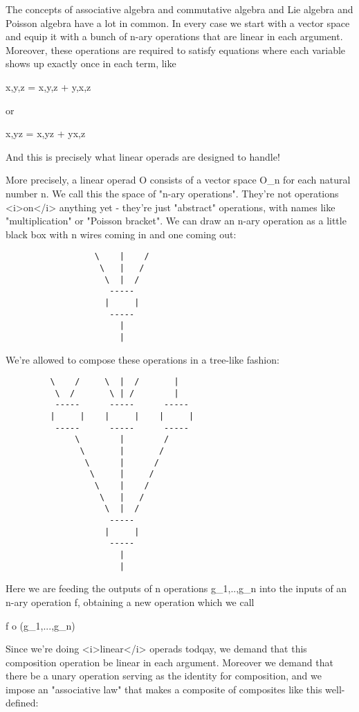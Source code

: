The concepts of associative algebra and commutative algebra and Lie
algebra and Poisson algebra have a lot in common.  In every case we
start with a vector space and equip it with a bunch of n-ary
operations that are linear in each argument.  Moreover, these
operations are required to satisfy equations where each variable shows
up exactly once in each term, like

{x,{y,z}} = {{x,y},z} + {y,{x,z}}

or 

{x,yz} = {x,y}z + y{x,z}

And this is precisely what linear operads are designed to handle!

More precisely, a linear operad O consists of a vector space O_{n} for
each natural number n.  We call this the space of "n-ary operations".
They're not operations <i>on</i> anything yet - they're just
"abstract" operations, with names like
"multiplication" or "Poisson bracket".  We can
draw an n-ary operation as a little black box with n wires coming in
and one coming out:

\begin{verbatim}
                  \    |    /
                   \   |   / 
                    \  |  /
                     -----
                    |     | 
                     -----
                       |
                       |
\end{verbatim}
    
We're allowed to compose these operations in a tree-like fashion:

\begin{verbatim}
         \    /     \  |  /       | 
          \  /       \ | /        |
          -----      -----      -----
         |     |    |     |    |     |
          -----      -----      -----
              \        |        /  
               \       |       /
                \      |      /
                 \     |     /
                  \    |    / 
                   \   |   /  
                    \  |  /
                     -----
                    |     | 
                     -----
                       |
                       |
\end{verbatim}
    

Here we are feeding the outputs of n operations
g_{1},..,g_{n} into the inputs of an n-ary operation
f, obtaining a new operation which we call

f o (g_{1},...,g_{n})

Since we're doing <i>linear</i> operads todqay, we demand that this
composition operation be linear in each argument.  Moreover we demand
that there be a unary operation serving as the identity for
composition, and we impose an "associative law" that makes a
composite of composites like this well-defined:

